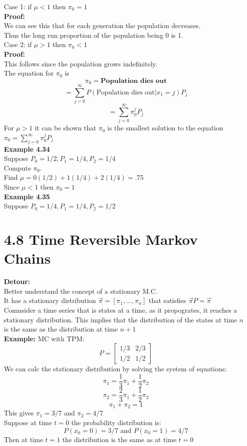 \documentclass{article}
\begin{document}
Case 1: if $\mu < 1$ then $\pi_0 = 1$\\
\textbf{Proof:}\\
We can see this that for each generation the population decreases.\\
Thus the long run proportion of the population being 0 is 1.\\
Case 2: if $\mu > 1$ then $\pi_0 < 1$\\
\textbf{Proof:}\\
This follows since the population grows indefinitely.\\
The equation for $\pi_0$ is
$$\pi_0 = \textbf{Population dies out}$$
$$= \sum_{j=0}^{\infty} P(\text{Population dies out} | x_1 = j)P_j$$
$$ = \sum_{j=0}^{\infty} \pi_0^j P_j$$
For $\mu > 1$ it can be shown that $\pi_0$ is the smallest solution to the equation $\pi_0 = \sum_{j=0}^{\infty} \pi_0^j P_j$\\

\textbf{Example 4.34}\\
Suppose $P_0 = 1/2, P_1 = 1/4, P_2 = 1/4$\\
Compute $\pi_0$.\\
Find $\mu = 0(1/2) + 1(1/4) + 2(1/4) = .75$\\
Since $\mu < 1$ then $\pi_0 = 1$\\

\textbf{Example 4.35}\\
Suppose $P_0 = 1/4 , P_1 = 1/4 , P_2 = 1/2$\\

\section*{4.8 Time Reversible Markov Chains}
\textbf{Detour:}\\
Better understand the concept of a stationary M.C.\\
It has a stationary distribution $\vec{\pi} = [\pi_1, \dots, \pi_n]$ that satisfies $\vec{\pi} P = \vec{\pi}$\\ 
Comnsider a time series that is states at a time, as it propogrates, it reaches a stationary distribution. This implies that the distribution of the states at time $n$ is the same as the distribution at time $n+1$\\
\textbf{Example:}
MC with TPM:
$$P = \begin{bmatrix}
    1/3 & 2/3\\
    1/2 & 1/2
\end{bmatrix}$$
We can calc the stationary distribution by solving the system of equations:
$$\pi_1 = \frac{1}{3}\pi_1 + \frac{1}{2}\pi_2$$
$$\pi_2 = \frac{2}{3}\pi_1 + \frac{1}{2}\pi_2$$
$$\pi_1 + \pi_2 = 1$$
This gives $\pi_1 = 3/7$ and $\pi_2 = 4/7$\\
Suppose at time $t=0$ the probability distribution is:
$$ P(x_0 = 0) = 3/7 \text{ and } P(x_0 = 1) = 4/7$$
Then at time $t=1$ the distribution is the same as at time $t=0$\\
\end{document}
